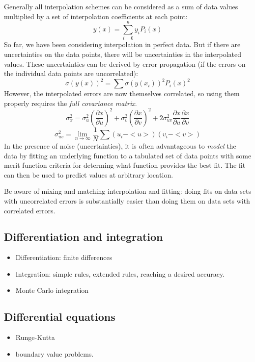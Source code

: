 \documentclass{article}
\begin{document}
Generally all interpolation schemes can be considered as a sum of data
values multiplied by a set of interpolation coefficients at each
point:
$$ {y(x) = \sum_{i=0}^{n} y_{i}P_{i}(x)} $$
So far, we have been considering interpolation in perfect data.
But if there are uncertainties on the data points, there will be
uncertainties in the interpolated values.
These uncertainties can be derived by error propagation (if the errors on
the individual data points are uncorrelated):
$$ \sigma(y(x))^{2} = \sum\sigma(y(x_{i}))^{2}P_{i}(x)^{2} $$
However, the interpolated errors are now themselves correlated,
so using them
properly requires the \emph{full covariance matrix}.
$$ \sigma_{x}^{2}=\sigma_{u}^{2}\left(\frac{\partial{x}}{\partial{u}}\right)^{2} +
\sigma_{v}^{2}\left(\frac{\partial{x}}{\partial{v}}\right)^{2} +
2\sigma_{uv}^{2}\frac{\partial{x}}{\partial{u}}\frac{\partial{x}}{\partial{v}} $$
$$ \sigma_{uv}^{2} = \lim_{n\rightarrow\infty}\frac{1}{N}
\sum(u_{i}-<u>)(v_{i}-<v>)$$
In the presence of noise (uncertainties), it is often advantageous to
\emph{model} the data by fitting an underlying function to a tabulated set of
data points with some merit function criteria for determing what
function provides the best fit. The fit can then be used to predict
values at arbitrary location.

Be aware of mixing and matching interpolation and fitting: doing fits on
data sets with uncorrelated errors is substantially easier than doing
them on data sets with correlated errors.

\subsection{Differentiation and integration}
\begin{itemize}
    \item Differentiation: finite differences
    \item Integration: simple
        rules, extended rules, reaching a desired accuracy.
    \item Monte Carlo integration
\end{itemize}

\subsection{Differential equations}
\begin{itemize}
    \item Runge-Kutta
    \item boundary value problems.
\end{itemize}
\end{document}
